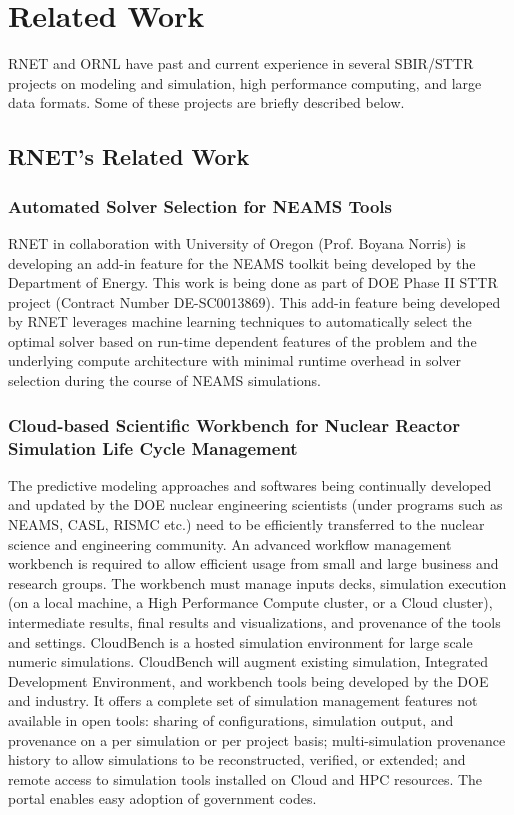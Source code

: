 
\section{Related Work}
\label{related}

RNET and ORNL have past and current experience in several SBIR/STTR projects on modeling and simulation, high performance computing, 
and large data formats. Some of these projects are briefly described below. 

\subsection{RNET's Related Work}

\subsubsection{Automated Solver Selection for NEAMS Tools}

RNET in collaboration with University of Oregon (Prof. Boyana Norris) is developing an add-in feature for the NEAMS 
toolkit being developed by the Department of Energy. This work is being done as part of DOE Phase II STTR project 
(Contract Number DE-SC0013869). This add-in feature being developed by RNET leverages machine learning techniques 
to automatically select the optimal solver based on run-time dependent features of the problem and the underlying 
compute architecture with minimal runtime overhead in solver selection during the course of NEAMS simulations. 


\subsubsection{Cloud-based Scientific Workbench for Nuclear Reactor Simulation Life Cycle Management}
The predictive modeling approaches and softwares being continually developed and updated by the DOE nuclear engineering scientists (under programs such as NEAMS, CASL, RISMC etc.) need to be efficiently transferred to the nuclear science and engineering community. An advanced workflow management workbench is required to allow efficient usage from small and large business and research groups. The workbench must manage inputs decks, simulation execution (on a local machine, a High Performance Compute cluster, or a Cloud cluster), intermediate results, final results and visualizations, and provenance of the tools and settings. CloudBench is a hosted simulation environment for large scale numeric simulations. CloudBench will augment existing simulation, Integrated Development Environment, and workbench tools being developed by the DOE and industry. It offers a complete set of simulation management features not available in open tools: sharing of configurations, simulation output, and provenance on a per simulation or per project basis; multi-simulation provenance history to allow simulations to be reconstructed, verified, or extended; and remote access to simulation tools installed on Cloud and HPC resources. The portal enables easy adoption of government codes. 

